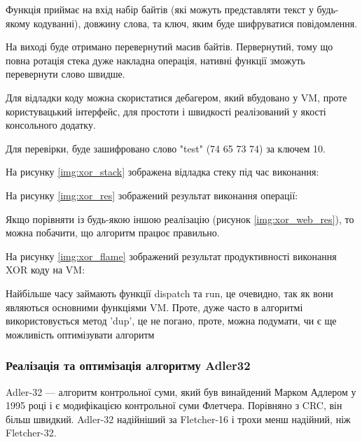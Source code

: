 \documentclass{lib/styles/default-style}
\begin{document}
    Функція приймає на вхід набір байтів (які можуть представляти текст у будь-якому кодуванні), довжину слова, та ключ, яким буде
    шифруватися повідомлення.
    
    На виході буде отримано перевернутий масив байтів. Первернутий, тому що повна ротація стека дуже накладна операція, нативні функції
    зможуть перевернути слово швидше.

    Для відладки коду можна скористатися дебагером, який вбудовано у VM, проте користувацький інтерфейс, для простоти і швидкості
    реалізований у якості консольного додатку.

    Для перевірки, буде зашифровано слово "test" (74 65 73 74) за ключем 10.

    На рисунку \ref{img:xor_stack} зображена відладка стеку під час виконання:

    
    На рисунку \ref{img:xor_res} зображений результат виконання операції:

    
    Якщо порівняти із будь-якою іншою реалізацію (рисунок \ref{img:xor_web_res}), то можна побачити, що алгоритм працює правильно.


    На рисунку \ref{img:xor_flame} зображений результат продуктивності виконання XOR коду на VM:


    Найбільше часу займають функції dispatch та run, це очевидно, так як вони являються основними функціями VM.
    Проте, дуже часто в алгоритмі використовується метод 'dup', це не погано,
    проте, можна подумати, чи є ще можливість оптимізувати алгоритм

    \subsubsection{Реалізація та оптимізація алгоритму Adler32}
    
    Adler-32 --- алгоритм контрольної суми, який був винайдений Марком Адлером у 1995 році і є модифікацією контрольної суми Флетчера.
    Порівняно з CRC, він більш швидкий. Adler-32 надійніший за Fletcher-16 і трохи менш надійний, ніж Fletcher-32.
\end{document}
